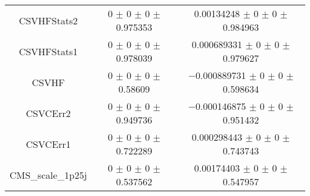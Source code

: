 \begin{table}
\begin{tabular}{ccc}
CSVHFStats2 & \num{0} $\pm$ \num{0} $\pm$ \num{0} $\pm$ \num{0.975353} & \num{0.00134248} $\pm$ \num{0} $\pm$ \num{0} $\pm$ \num{0.984963}\\
CSVHFStats1 & \num{0} $\pm$ \num{0} $\pm$ \num{0} $\pm$ \num{0.978039} & \num{0.000689331} $\pm$ \num{0} $\pm$ \num{0} $\pm$ \num{0.979627}\\
CSVHF & \num{0} $\pm$ \num{0} $\pm$ \num{0} $\pm$ \num{0.58609} & \num{-0.000889731} $\pm$ \num{0} $\pm$ \num{0} $\pm$ \num{0.598634}\\
CSVCErr2 & \num{0} $\pm$ \num{0} $\pm$ \num{0} $\pm$ \num{0.949736} & \num{-0.000146875} $\pm$ \num{0} $\pm$ \num{0} $\pm$ \num{0.951432}\\
CSVCErr1 & \num{0} $\pm$ \num{0} $\pm$ \num{0} $\pm$ \num{0.722289} & \num{0.000298443} $\pm$ \num{0} $\pm$ \num{0} $\pm$ \num{0.743743}\\
CMS\_scale\_1p25j & \num{0} $\pm$ \num{0} $\pm$ \num{0} $\pm$ \num{0.537562} & \num{0.00174403} $\pm$ \num{0} $\pm$ \num{0} $\pm$ \num{0.547957}\\
\bottomrule
\end{tabular}
\end{table}